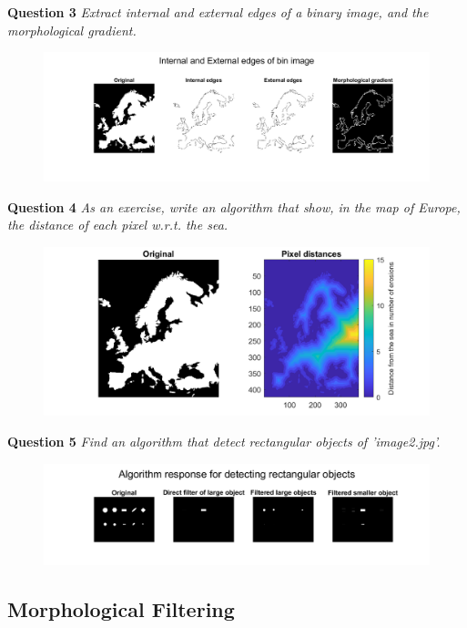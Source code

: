 \newpage
\textbf{Question 3} \textit{Extract internal and external edges of a binary image, and the morphological gradient.}
\begin{figure}[h]
    \centering
    \includegraphics[width=1\linewidth]{Doc/Graphics/Part2/Part2_Question3.png}
\end{figure}


\textbf{Question 4} \textit{As an exercise, write an algorithm that show, in the map of Europe, the distance of each pixel w.r.t. the sea.}
\begin{figure}[h]
    \centering
    \includegraphics[width=0.75\linewidth]{Doc/Graphics/Part2/part2_Question4.png}
\end{figure}



\textbf{Question 5} \textit{Find an algorithm that detect rectangular objects of ’image2.jpg’.}

\begin{figure}[H]
    \centering
    \includegraphics[width=\linewidth]{Doc/Graphics/Part2/Part2_Q5.png}
\end{figure}


\subsection{Morphological Filtering}
